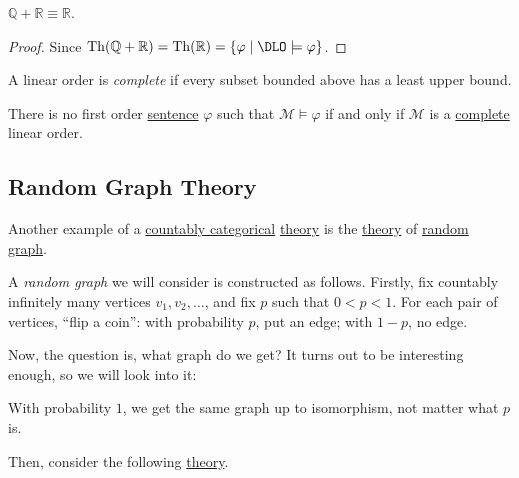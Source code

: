 \begin{corollary}
	\(\mathbb{Q} + \mathbb{R} \equiv \mathbb{R} \).
\end{corollary}
\begin{proof}
	Since \(\mathop{\mathrm{Th}}(\mathbb{Q} + \mathbb{R} ) = \mathop{\mathrm{Th}}(\mathbb{R} ) = \left\{ \varphi \mid \DLO \models \varphi \right\}\).
\end{proof}

\begin{definition}[Complete]\label{def:linear-order-complete}
	A linear order is \emph{complete} if every subset bounded above has a least upper bound.
\end{definition}

\begin{corollary}
	There is no first order \hyperref[def:sentence]{sentence} \(\varphi \) such that \(\mathcal{M} \models \varphi \) if and only if \(\mathcal{M} \) is a \hyperref[def:linear-order-complete]{complete} linear order.
\end{corollary}

\subsection{Random Graph Theory}
Another example of a \hyperref[def:countably-categorical]{countably categorical} \hyperref[def:theory]{theory} is the \hyperref[def:theory]{theory} of \hyperref[def:random-graph]{random graph}.

\begin{definition}\label{def:random-graph}
	A \emph{random graph} we will consider is constructed as follows. Firstly, fix countably infinitely many vertices \(v_1, v_2, \dots \), and fix \(p\) such that \(0 < p < 1\). For each pair of vertices, ``flip a coin'': with probability \(p\), put an edge; with \(1-p\), no edge.
\end{definition}

Now, the question is, what graph do we get? It turns out to be interesting enough, so we will look into it:

\begin{remark}
	With probability \(1\), we get the same graph up to isomorphism, not matter what \(p\) is.
\end{remark}

Then, consider the following \hyperref[def:theory]{theory}.

